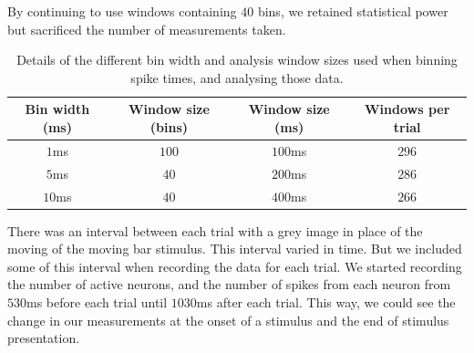     By continuing to use windows containing $40$ bins, we retained statistical power but sacrificed the number of measurements taken.

    \begin{table}
      \centering
      \begin{tabular}[h]{|c|c|c|c|}
        \hline
        \textbf{Bin width (ms)}   & \textbf{Window size (bins)}   & \textbf{Window size (ms)} & \textbf{Windows per trial}  \\ \hline
        $1$ms                     & $100$                         & $100$ms                   & $296$                       \\ \hline
        $5$ms                     & $40$                          & $200$ms                   & $286$                       \\ \hline
        $10$ms                    & $40$                          & $400$ms                   & $266$                       \\ \hline
      \end{tabular}
      \caption{Details of the different bin width and analysis window sizes used when binning spike times, and analysing those data.}
      \label{tab:bin_widths}
    \end{table}

    There was an interval between each trial with a grey image in place of the moving of the moving bar stimulus. This interval varied in time. But we included some of this interval when recording the data for each trial. We started recording the number of active neurons, and the number of spikes from each neuron from $530$ms before each trial until $1030$ms after each trial. This way, we could see the change in our measurements at the onset of a stimulus and the end of stimulus presentation.

